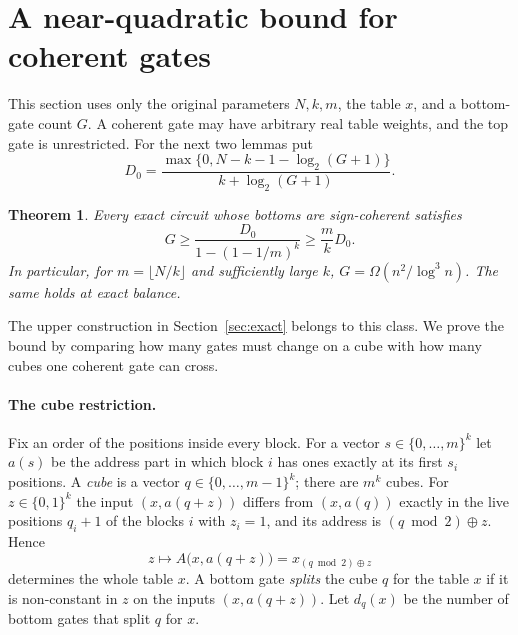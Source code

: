 \documentclass[11pt]{article}
\newtheorem{theorem}{Theorem}[section]
\newcommand{\bits}{\{0,1\}}
\newcommand{\smalltitle}[1]{\paragraph{#1}}
\begin{document}
\section{A near-quadratic bound for coherent gates}\label{sec:coherent}
This section uses only the original parameters $N,k,m$, the table $x$, and
a bottom-gate count $G$. A coherent gate may have arbitrary real table
weights, and the top gate is unrestricted. For the next two lemmas put
$$D_0=\frac{\max\{0,N-k-1-\log_2(G+1)\}}{k+\log_2(G+1)}.$$
\begin{theorem}\label{thm:coherent}
Every exact circuit whose bottoms are sign-coherent satisfies
$$G\ge\frac{D_0}{1-(1-1/m)^k}\ge\frac m k D_0.$$
In particular, for $m=\lfloor N/k\rfloor$ and sufficiently large $k$,
$G=\Omega(n^2/\log^3n)$. The same holds at exact balance.
\end{theorem}
The upper construction in Section~\ref{sec:exact} belongs to this class.
We prove the bound by comparing how many gates must change on a cube
with how many cubes one coherent gate can cross.
\smalltitle{The cube restriction.}
Fix an order of the positions inside every block. For a vector
$s\in\{0,\dots,m\}^k$ let $a(s)$ be the address part in which block $i$ has
ones exactly at its first $s_i$ positions. A \emph{cube} is a vector
$q\in\{0,\dots,m-1\}^k$; there are $m^k$ cubes. For $z\in\bits^k$ the input
$(x,a(q+z))$ differs from $(x,a(q))$ exactly in the live positions
$q_i+1$ of the blocks $i$ with $z_i=1$, and its address is
$(q\bmod2)\oplus z$. Hence
$$
z\mapsto A\bigl(x,a(q+z)\bigr)=x_{(q\bmod 2)\oplus z}
$$
determines the whole table $x$. A bottom gate \emph{splits} the cube $q$ for
the table $x$ if it is non-constant in $z$ on the inputs $(x,a(q+z))$. Let
$d_q(x)$ be the number of bottom gates that split $q$ for $x$.
\end{document}
